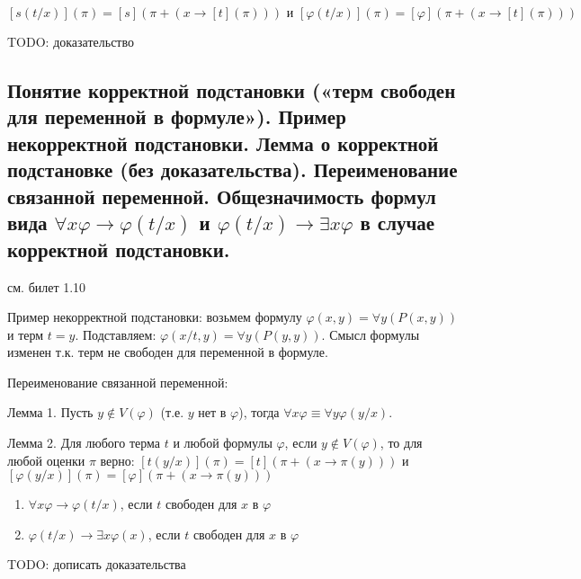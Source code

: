 \documentclass[a4paper, 10pt]{article}
\begin{document}
$$ [s(t/x)](\pi) = [s](\pi + (x \to [t](\pi))) \text{ и } [\varphi(t/x)](\pi)=[\varphi](\pi + (x\to [t](\pi))) $$

TODO: доказательство

\subsection{Понятие корректной подстановки («терм свободен для переменной в формуле»). Пример некорректной подстановки. Лемма о корректной подстановке (без доказательства). Переименование связанной переменной. Общезначимость формул вида $\forall x\varphi \to \varphi(t/x)$ и $\varphi(t/x) \to \exists x \varphi$ в случае корректной подстановки.}

см. билет 1.10

Пример некорректной подстановки: возьмем формулу $\varphi(x,y)=\forall y (P(x,y))$ и терм $t=y$. Подставляем: $\varphi(x/t,y)=\forall y (P(y,y))$. Смысл формулы изменен т.к. терм не свободен для переменной в формуле.

\hfill

Переименование связанной переменной:

Лемма 1. Пусть $y\not\in V(\varphi)$ (т.е. $y$ нет в $\varphi$), тогда $\forall x\varphi \equiv \forall y\varphi(y/x)$.

Лемма 2. Для любого терма $t$ и любой формулы $\varphi$, если $y \not\in V(\varphi)$, то для любой оценки $\pi$ верно: $[t(y/x)](\pi)=[t](\pi + (x \to \pi(y)))$ и $[\varphi(y/x)](\pi)=[\varphi](\pi + (x \to \pi(y)))$

\hfill

\begin{enumerate}
    \item $\forall x\varphi \to \varphi(t/x)$, если $t$ свободен для $x$ в $\varphi$
    \item $\varphi(t/x) \to \exists x \varphi(x)$, если $t$ свободен для $x$ в $\varphi$
\end{enumerate}

\hfill

TODO: дописать доказательства

\end{document}
